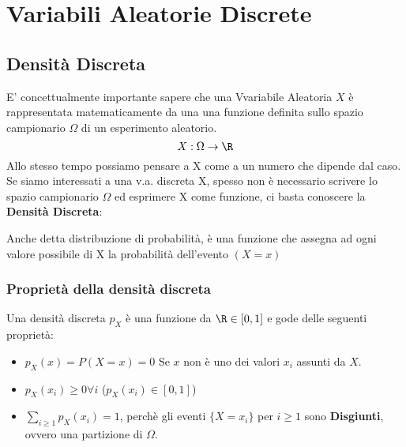 \pagebreak
\section{Variabili Aleatorie Discrete}

\subsection{Densità Discreta}
E' concettualmente importante sapere che una Vvariabile Aleatoria $X$ è rappresentata matematicamente da una
una funzione definita sullo spazio campionario $\Omega$ di un esperimento aleatorio.
\[
    X:\Omega \to \R
\]
Allo stesso tempo possiamo pensare a X come a un numero che dipende dal caso.
Se siamo interessati a una v.a. discreta X, spesso non è necessario scrivere lo
spazio campionario $\Omega$ ed esprimere X come funzione, 
ci basta conoscere la \textbf{Densità Discreta}:

Anche detta distribuzione di probabilità, è una funzione che assegna
ad ogni valore possibile di X la probabilità dell'evento $(X = x)$
\subsubsection{Proprietà della densità discreta}
Una densità discreta $p_X$ è una funzione da $\R \in [0,1]$ e gode delle seguenti proprietà:
\begin{itemize}
    \item $p_X(x) = P(X=x) = 0$ Se $x$ non è uno dei valori $x_i$ assunti da $X$.
    \item $p_X(x_i) \geq 0 \forall i$ ($p_X(x_i)\in [0,1]$)
    \item $\sum_{i\geq 1} p_X(x_i) = 1$, perchè gli eventi $\{X=x_i\}$ per $i\geq 1$ sono \textbf{Disgiunti}, ovvero una partizione di $\Omega$.
\end{itemize}

